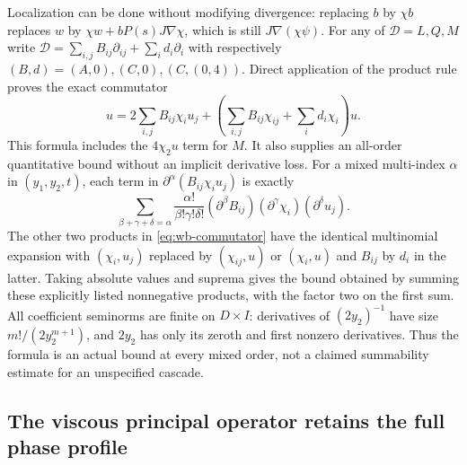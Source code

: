 Localization can be done without modifying divergence: replacing $b$
by $\chi b$ replaces $w$ by
$\chi w+bP(s)J\nabla\chi$, which is still $J\nabla(\chi\psi)$.
For any of $\mathcal D=L,Q,M$ write
$\mathcal D=\sum_{i,j}B_{ij}\partial_{ij}+\sum_i d_i\partial_i$
with respectively $(B,d)=(A,0),(C,0),(C,(0,4))$. Direct application
of the product rule proves the exact commutator
\begin{equation}
 [\mathcal D,\chi]u
 =2\sum_{i,j}B_{ij}\chi_i u_j
 +\left(\sum_{i,j}B_{ij}\chi_{ij}+\sum_i d_i\chi_i\right)u.
 \label{eq:wb-commutator}
\end{equation}
This formula includes the $4\chi_2u$ term for $M$.
It also supplies an all-order quantitative bound without an implicit
derivative loss. For a mixed multi-index $\alpha$ in $(y_1,y_2,t)$,
each term in $\partial^\alpha(B_{ij}\chi_i u_j)$ is exactly
\[
 \sum_{\beta+\gamma+\delta=\alpha}
 \frac{\alpha!}{\beta!\gamma!\delta!}
 (\partial^\beta B_{ij})(\partial^\gamma\chi_i)
 (\partial^\delta u_j).
\]
The other two products in \eqref{eq:wb-commutator} have the identical
multinomial expansion with $(\chi_i,u_j)$ replaced by
$(\chi_{ij},u)$ or $(\chi_i,u)$ and $B_{ij}$ by $d_i$ in the latter.
Taking absolute values and suprema gives the bound obtained by summing
these explicitly listed nonnegative products, with the factor two on
the first sum. All coefficient seminorms are finite on
$D\times I$: derivatives of $(2y_2)^{-1}$ have size
$m!/(2y_2^{m+1})$, and $2y_2$ has only its zeroth and first
nonzero derivatives. Thus the formula is an actual bound at every
mixed order, not a claimed summability estimate for an unspecified cascade.

\subsection{The viscous principal operator retains the full phase profile}

